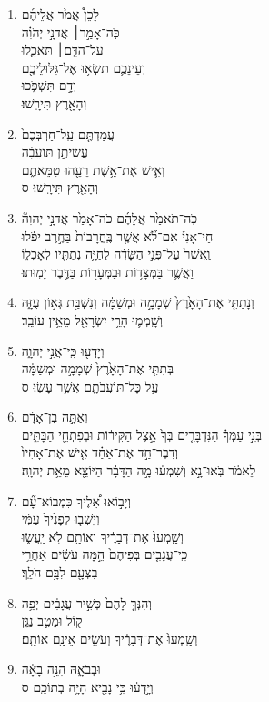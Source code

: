 \documentclass[12pt,a4paper,titlepage]{article}
\def \pslabelsep{-0.9em} %
\def \psleftmargin{0em} %
\begin{document}
\begin{enumerate}[leftmargin=\psleftmargin, labelsep = \pslabelsep, label={\arabic*}, font=\color{\pscolor}\small\textsuperscript, parsep=0em, itemsep=0em, topsep=0em ]
\item \texthebrew{לָכֵן֩ אֱמֹ֙ר אֲלֵיהֶ֜ם \\ כֹּֽה־אָמַ֣ר׀ אֲדֹנָ֣י יְהֹוִ֗ה \\ עַל־הַדָּ֧ם׀ תֹּאכֵ֛לוּ \\ וְעֵינֵכֶ֛ם תִּשְׂא֥וּ אֶל־גִּלּוּלֵיכֶ֖ם \\ וְדָ֣ם תִּשְׁפֹּ֑כוּ \\ וְהָאָ֖רֶץ תִּירָֽשׁוּ׃}
\item \texthebrew{עֲמַדְתֶּ֤ם עַֽל־חַרְבְּכֶם֙ \\ עֲשִׂיתֶ֣ן תּוֹעֵבָ֔ה \\ וְאִ֛ישׁ אֶת־אֵ֥שֶׁת רֵעֵ֖הוּ טִמֵּאתֶ֑ם \\ וְהָאָ֖רֶץ תִּירָֽשׁוּ׃ ס}\verseSpace
\item \texthebrew{כֹּֽה־תֹאמַ֙ר אֲלֵהֶ֜ם כֹּה־אָמַ֙ר אֲדֹנָ֣י יְהוִה֘ \\ חַי־אָנִי֒ אִם־לֹ֞א אֲשֶׁ֤ר בֶּֽחֳרָבוֹת֙ בַּחֶ֣רֶב יִפֹּ֔לוּ \\ וַֽאֲשֶׁר֙ עַל־פְּנֵ֣י הַשָּׂדֶ֔ה לַחַיָּ֥ה נְתַתִּ֖יו לְאָכְל֑וֹ \\ וַאֲשֶׁ֛ר בַּמְּצָד֥וֹת וּבַמְּעָר֖וֹת בַּדֶּ֥בֶר יָמֽוּתוּ׃}
\item \texthebrew{וְנָתַתִּ֤י אֶת־הָאָ֙רֶץ֙ שְׁמָמָ֣ה וּמְשַׁמָּ֔ה וְנִשְׁבַּ֖ת גְּא֣וֹן עֻזָּ֑הּ \\ וְשָֽׁמְמ֛וּ הָרֵ֥י יִשְׂרָאֵ֖ל מֵאֵ֥ין עוֹבֵֽר׃}
\item \texthebrew{וְיָדְע֖וּ כִּֽי־אֲנִ֣י יְהוָ֑ה \\ בְּתִתִּ֤י אֶת־הָאָ֙רֶץ֙ שְׁמָמָ֣ה וּמְשַׁמָּ֔ה \\ עַ֥ל כָּל־תּוֹעֲבֹתָ֖ם אֲשֶׁ֥ר עָשֽׂוּ׃ ס}\verseSpace
\item \texthebrew{וְאַתָּ֣ה בֶן־אָדָ֔ם \\ בְּנֵ֣י עַמְּךָ֗ הַנִּדְבָּרִ֤ים בְּךָ֙ אֵ֣צֶל הַקִּיר֔וֹת וּבְפִתְחֵ֖י הַבָּתִּ֑ים \\ וְדִבֶּר־חַ֣ד אֶת־אַחַ֗ד אִ֤ישׁ אֶת־אָחִיו֙ \\ לֵאמֹ֔ר בֹּֽאוּ־נָ֣א וְשִׁמְע֔וּ מָ֣ה הַדָּבָ֔ר הַיּוֹצֵ֖א מֵאֵ֥ת יְהוָֽה׃}\verseSpace
\item \texthebrew{וְיָב֣וֹאוּ אֵ֠לֶיךָ כִּמְבוֹא־עָ֞ם \\ וְיֵשְׁב֤וּ לְפָנֶ֙יךָ֙ עַמִּ֔י \\ וְשָֽׁמְעוּ֙ אֶת־דְּבָרֶ֔יךָ וְאוֹתָ֖ם לֹ֣א יַֽעֲשׂ֑וּ \\ כִּֽי־עֲגָבִ֤ים בְּפִיהֶם֙ הֵ֣מָּה עֹשִׂ֔ים אַחֲרֵ֥י \\ בִצְעָ֖ם לִבָּ֥ם הֹלֵֽךְ׃}\verseSpace
\item \texthebrew{וְהִנְּךָ֤ לָהֶם֙ כְּשִׁ֣יר עֲגָבִ֔ים יְפֵ֥ה \\ ק֖וֹל וּמֵטִ֣ב נַגֵּ֑ן \\ וְשָֽׁמְעוּ֙ אֶת־דְּבָרֶ֔יךָ וְעֹשִׂ֥ים אֵינָ֖ם אוֹתָֽם׃}\verseSpace
\item \texthebrew{וּבְבֹאָ֑הּ הִנֵּ֣ה בָאָ֔ה \\ וְיָ֣דְע֔וּ כִּ֥י נָבִ֖יא הָיָ֥ה בְתוֹכָֽם׃ ס}
\end{enumerate}
\newpage
\end{document}
